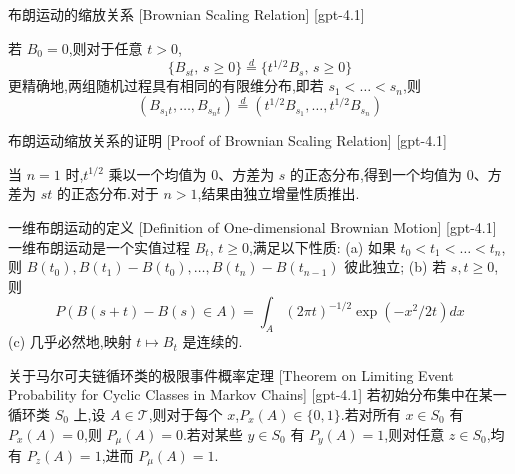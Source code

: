 \documentclass[UTF8]{ctexart}
\begin{document}
    
    
    \begin{thm}
        {布朗运动的缩放关系}
        [Brownian Scaling Relation]
        [gpt-4.1]
        
若 $B_0 = 0$,则对于任意 $t > 0$,
\[
\{B_{st},\, s \geq 0\} \stackrel{d}{=} \{t^{1/2} B_s,\, s \geq 0\}
\]
更精确地,两组随机过程具有相同的有限维分布,即若 $s_1 < \ldots < s_n$,则
\[
(B_{s_1 t}, \ldots, B_{s_n t}) \stackrel{d}{=} (t^{1/2} B_{s_1}, \ldots, t^{1/2} B_{s_n})
\]

    \end{thm}
    
    
    
    \begin{prf}
        {布朗运动缩放关系的证明}
        [Proof of Brownian Scaling Relation]
        [gpt-4.1]
        
当 $n = 1$ 时,$t^{1/2}$ 乘以一个均值为 0、方差为 $s$ 的正态分布,得到一个均值为 0、方差为 $st$ 的正态分布.对于 $n > 1$,结果由独立增量性质推出.

    \end{prf}
    
    
    
    \begin{dfn}
        {一维布朗运动的定义}
        [Definition of One-dimensional Brownian Motion]
        [gpt-4.1]
        一维布朗运动是一个实值过程 $B_t$, $t \geq 0$,满足以下性质:
(a) 如果 $t_0 < t_1 < \ldots < t_n$,则 $B(t_0), B(t_1) - B(t_0), \ldots, B(t_n) - B(t_{n-1})$ 彼此独立;
(b) 若 $s, t \geq 0$,则
\[
P(B(s+t) - B(s) \in A) = \int_A (2\pi t)^{-1/2} \exp(-x^2/2t) dx
\]
(c) 几乎必然地,映射 $t \mapsto B_t$ 是连续的.
    \end{dfn}
    
    
    
    \begin{thm}
        {关于马尔可夫链循环类的极限事件概率定理}
        [Theorem on Limiting Event Probability for Cyclic Classes in Markov Chains]
        [gpt-4.1]
        若初始分布集中在某一循环类 $S_0$ 上,设 $A \in \mathcal{T}$,则对于每个 $x$,$P_x(A) \in \{0, 1\}$.若对所有 $x \in S_0$ 有 $P_x(A) = 0$,则 $P_\mu(A) = 0$.若对某些 $y \in S_0$ 有 $P_y(A) = 1$,则对任意 $z \in S_0$,均有 $P_z(A) = 1$,进而 $P_\mu(A) = 1$.
    \end{thm}
    
\end{document}
